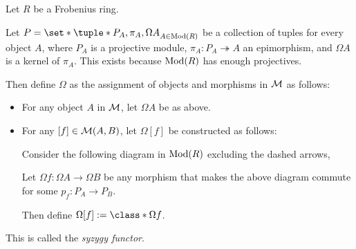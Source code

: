 \begin{definition}
    \label{def:stmod_omega}
    Let \( R \) be a Frobenius ring.

    Let \( P = \set*{\tuple*{P_A, \pi_A, \Omega A}}_{A \in \Mod(R)} \) be a collection of tuples for every object \( A \), where \( P_A \) is a projective module, \( \pi_A: P_A \twoheadrightarrow A \) an epimorphism, and \( \Omega A \) is a kernel of \( \pi_A \). This exists because \( \operatorname{Mod}(R) \) has enough projectives.

    Then define \( \Omega \) as the assignment of objects and morphisms in \( {\mathcal{M}} \) as follows:
    \begin{itemize}
        \item {
            For any object \( A \) in \( {\mathcal{M}} \), let \( \Omega A \) be as above.
        }
        \item {
            For any \( [f] \in {\mathcal{M}}(A, B) \), let \( \Omega [f] \) be constructed as follows:

            Consider the following diagram in \( \operatorname{Mod}(R) \) excluding the dashed arrows,
            \begin{center}
            \end{center}
            Let \( \Omega f: \Omega A \to \Omega B \) be any morphism that makes the above diagram commute for some \( p_f: P_A \to P_B \).

            Then define \( \Omega [f] := \class*{\Omega f} \).
        }
    \end{itemize}
    This is called the \emph{syzygy functor}.
\end{definition}

